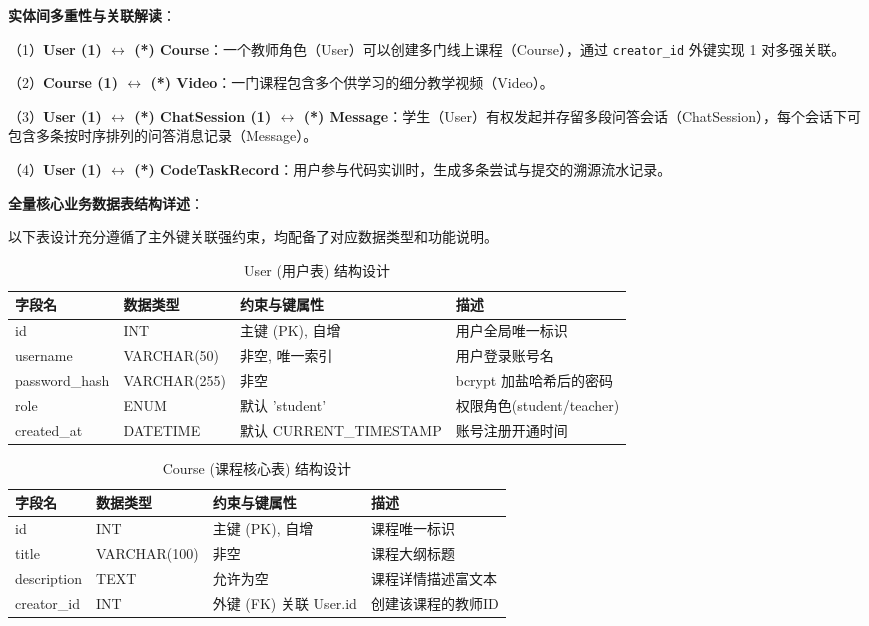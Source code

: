 \textbf{实体间多重性与关联解读}：

（1）\textbf{User (1) $\leftrightarrow$ (*) Course}：一个教师角色（User）可以创建多门线上课程（Course），通过 \texttt{creator\_id} 外键实现 1 对多强关联。

（2）\textbf{Course (1) $\leftrightarrow$ (*) Video}：一门课程包含多个供学习的细分教学视频（Video）。

（3）\textbf{User (1) $\leftrightarrow$ (*) ChatSession (1) $\leftrightarrow$ (*) Message}：学生（User）有权发起并存留多段问答会话（ChatSession），每个会话下可包含多条按时序排列的问答消息记录（Message）。

（4）\textbf{User (1) $\leftrightarrow$ (*) CodeTaskRecord}：用户参与代码实训时，生成多条尝试与提交的溯源流水记录。

\textbf{全量核心业务数据表结构详述}：

以下表设计充分遵循了主外键关联强约束，均配备了对应数据类型和功能说明。

\begin{table}[htbp]
\centering
\small
\caption{User (用户表) 结构设计}
\label{tab:user_table}
\begin{tabular}{|p{2cm}|p{2cm}|p{5cm}|p{4.5cm}|}
\hline
\textbf{字段名} & \textbf{数据类型} & \textbf{约束与键属性} & \textbf{描述} \\ \hline
id & INT & 主键 (PK), 自增 & 用户全局唯一标识 \\ \hline
username & VARCHAR(50) & 非空, 唯一索引 & 用户登录账号名 \\ \hline
password\_hash & VARCHAR(255)& 非空 & bcrypt 加盐哈希后的密码 \\ \hline
role & ENUM & 默认 'student' & 权限角色(student/teacher) \\ \hline
created\_at & DATETIME & 默认 CURRENT\_TIMESTAMP & 账号注册开通时间 \\ \hline
\end{tabular}
\end{table}

\begin{table}[htbp]
\centering
\small
\caption{Course (课程核心表) 结构设计}
\label{tab:course_table}
\begin{tabular}{|p{2.5cm}|p{2cm}|p{4.5cm}|p{4.5cm}|}
\hline
\textbf{字段名} & \textbf{数据类型} & \textbf{约束与键属性} & \textbf{描述} \\ \hline
id & INT & 主键 (PK), 自增 & 课程唯一标识 \\ \hline
title & VARCHAR(100) & 非空 & 课程大纲标题 \\ \hline
description & TEXT & 允许为空 & 课程详情描述富文本 \\ \hline
creator\_id & INT & 外键 (FK) 关联 User.id & 创建该课程的教师ID \\ \hline
\end{tabular}
\end{table}

